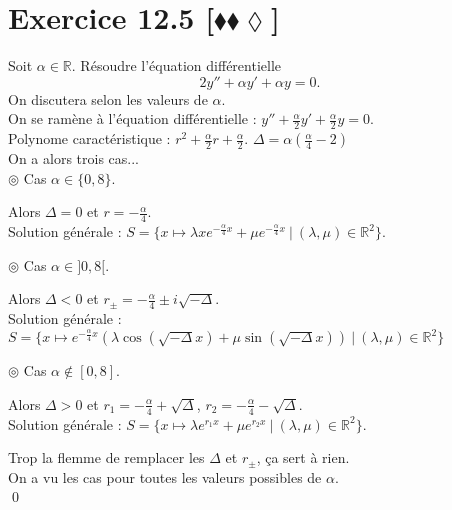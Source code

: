 \documentclass[10pt]{article}
\begin{document}
\section*{Exercice 12.5 [$\blacklozenge\blacklozenge\lozenge$]}
\begin{tcolorbox}[enhanced, width=7.5in, center, size=fbox, fontupper=\large, drop shadow southwest]
    Soit $\alpha\in\mathbb{R}$. Résoudre l'équation différentielle
    \begin{equation*}
        2y'' + \alpha y' + \alpha y = 0.
    \end{equation*}
    On discutera selon les valeurs de $\alpha$.\\[0.1cm]
    On se ramène à l'équation différentielle : $y'' + \frac{\alpha}{2}y' + \frac{\alpha}{2}y = 0$.\\
    Polynome caractéristique : $r^2 + \frac{\alpha}{2}r + \frac{\alpha}{2}$. $\Delta=\alpha(\frac{\alpha}{4}-2)$\\
    On a alors trois cas...\\
    $\circledcirc$ Cas $\alpha\in\{0, 8\}$.
    \begin{adjustwidth}{1cm}{}
        Alors $\Delta=0$ et $r=-\frac{\alpha}{4}$.\\
        Solution générale : $S = \{x\mapsto \lambda x e^{-\frac{\alpha}{4}x} + \mu e^{-\frac{\alpha}{4}x} ~ | ~ (\lambda, \mu)\in\mathbb{R}^2\}$.
    \end{adjustwidth}
    $\circledcirc$ Cas $\alpha\in]0,8[$.
    \begin{adjustwidth}{1cm}{}
        Alors $\Delta<0$ et $r_\pm = -\frac{\alpha}{4} \pm i\sqrt{-\Delta}$.\\
        Solution générale : $S = \{x\mapsto e^{-\frac{\alpha}{4}x} \left( \lambda \cos(\sqrt{-\Delta}x) + \mu\sin(\sqrt{-\Delta}x) \right) ~ | ~  (\lambda,\mu)\in\mathbb{R}^2\}$
    \end{adjustwidth}
    $\circledcirc$ Cas $\alpha\notin[0,8]$.
    \begin{adjustwidth}{1cm}{}
        Alors $\Delta>0$ et $r_1 = -\frac{\alpha}{4} + \sqrt{\Delta}$, $r_2 = -\frac{\alpha}{4} - \sqrt{\Delta}$.\\
        Solution générale : $S=\{x\mapsto \lambda e^{r_1x} + \mu e^{r_2x} ~ | ~ (\lambda,\mu)\in\mathbb{R}^2\}$.
    \end{adjustwidth}
    Trop la flemme de remplacer les $\Delta$ et $r_\pm$, ça sert à rien.\\
    On a vu les cas pour toutes les valeurs possibles de $\alpha$.\\
    \qed
\end{tcolorbox}
\end{document}
